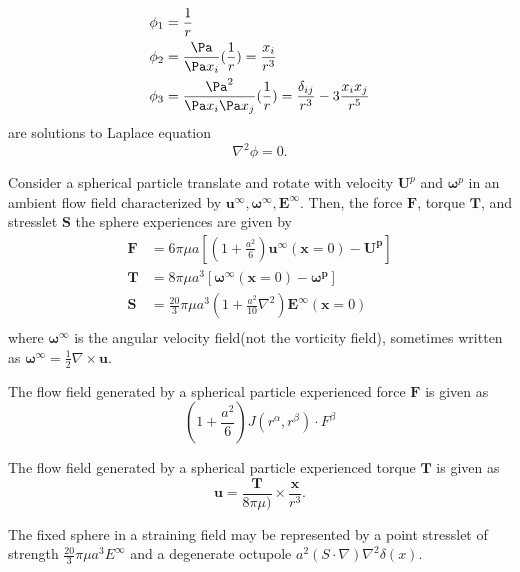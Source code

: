 \begin{refsection}
\begin{lemma}\label{ch:microhydrodynamics:th:commonsolutiontoLaplaceEquation}
\begin{align*}
\phi_1 &= \frac{1}{r}\\
\phi_2 &= \frac{\Pa}{\Pa x_i}(\frac{1}{r})=\frac{x_i}{r^3}\\
\phi_3 &= \frac{\Pa^2}{\Pa x_i\Pa x_j}(\frac{1}{r})= \frac{\delta_{ij}}{r^3}  - 3\frac{x_ix_j}{r^5}
\end{align*}
are solutions to Laplace equation $$\nabla^2 \phi = 0.$$
\end{lemma}


\begin{lemma}\cite[46]{guazzelli2011physical}\cite[51]{kim2013microhydrodynamics}
Consider a spherical particle translate and rotate with velocity $\bm{U}^p$ and $\bm{\omega}^p$ in an ambient flow field characterized by $\bm{u}^\infty, \bm{\omega}^\infty, \bm{E}^\infty$. Then, the force $\bm{F}$, torque $\bm{T}$, and stresslet $\bm{S}$ the sphere experiences are given by
\begin{align*}
\bm{F} &= 6\pi\mu a[(1 + \frac{a^2}{6})\bm{u}^\infty(\bm{x} = 0) - \bm{U^p}]\\
\bm{T} &= 8\pi\mu a^3[\bm{\omega}^\infty(\bm{x} = 0) - \bm{\omega^p}]\\
\bm{S} &= \frac{20}{3}\pi\mu a^3(1 + \frac{a^2}{10}\nabla^2)\bm{E}^\infty(\bm{x} = 0)\\
\end{align*}
where $\bm{\omega}^\infty$ is the angular velocity field(not the vorticity field), sometimes written as $\bm{\omega}^\infty = \frac{1}{2}\nabla \times \bm{u}$.

The flow field generated by a spherical particle experienced force $\bm{F}$ is given as
$$(1+\frac{a^2}{6})J(r^\alpha,r^\beta)\cdot F^\beta$$

The flow field generated by a spherical particle experienced torque $\bm{T}$ is given as
$$\bm{u}=\frac{\bm{T}}{8\pi \mu)}\times \frac{\bm{x}}{r^3}.$$


The fixed sphere in a straining field may be represented by a point stresslet of strength $\frac{20}{3}\pi\mu a^3 E^\infty$ and a degenerate octupole $a^2(S\cdot \nabla) \nabla^2 \delta(x)$.
\end{lemma}







\end{refsection}

